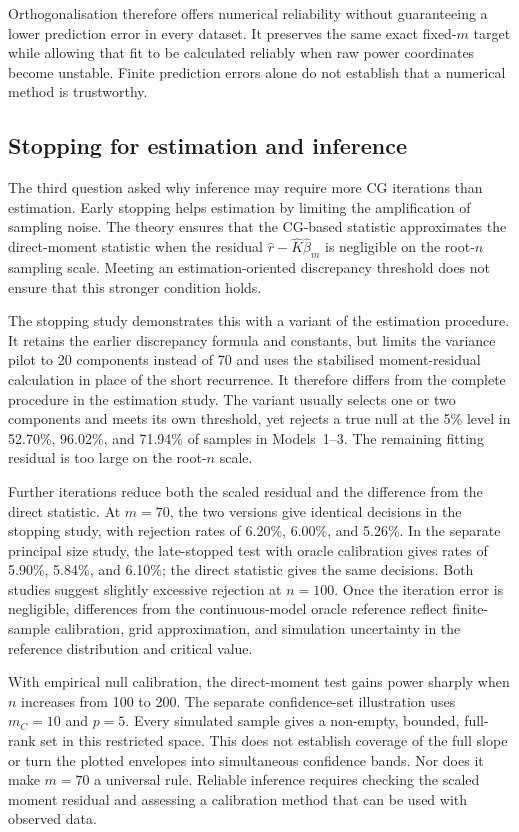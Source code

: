 Orthogonalisation therefore offers numerical reliability without
guaranteeing a lower prediction error in every dataset.  It preserves the
same exact fixed-$m$ target while allowing that fit to be calculated
reliably when raw power coordinates become unstable.  Finite prediction
errors alone do not establish that a numerical method is trustworthy.

\subsection{Stopping for estimation and inference}

The third question asked why inference may require more CG iterations
than estimation.  Early stopping helps estimation by limiting the
amplification of sampling noise.  The theory ensures that the CG-based
statistic approximates the direct-moment statistic when the residual
$\widehat r-\widehat K\widehat\beta_m$ is negligible on the root-$n$
sampling scale.  Meeting an estimation-oriented discrepancy threshold
does not ensure that this stronger condition holds.

The stopping study demonstrates this with a variant of the estimation
procedure.  It retains the earlier discrepancy formula and constants, but
limits the variance pilot to 20 components instead of 70 and uses the
stabilised moment-residual calculation in place of the short recurrence.
It therefore differs from the complete procedure in the estimation study.
The variant usually selects one or two components and meets its own
threshold, yet rejects a true null at the 5\% level in 52.70\%, 96.02\%,
and 71.94\% of samples in Models~1--3.  The remaining fitting residual is
too large on the root-$n$ scale.

Further iterations reduce both the scaled residual and the difference
from the direct statistic.  At $m=70$, the two versions give identical
decisions in the stopping study, with rejection rates of 6.20\%, 6.00\%,
and 5.26\%.  In the separate principal size study, the late-stopped test
with oracle calibration gives rates of 5.90\%, 5.84\%, and 6.10\%; the
direct statistic gives the same decisions.  Both studies suggest slightly
excessive rejection at $n=100$.  Once the iteration error is negligible,
differences from the continuous-model oracle reference reflect finite-sample
calibration, grid approximation, and simulation uncertainty in the reference
distribution and critical value.

With empirical null calibration, the direct-moment test gains power
sharply when $n$ increases from 100 to 200.  The separate confidence-set
illustration uses $m_C=10$ and $p=5$.  Every simulated sample gives a
non-empty, bounded, full-rank set in this restricted space.  This does not
establish coverage of the full slope or turn the plotted envelopes into
simultaneous confidence bands.  Nor does it make $m=70$ a universal rule.
Reliable inference requires checking the scaled moment residual and
assessing a calibration method that can be used with observed data.

